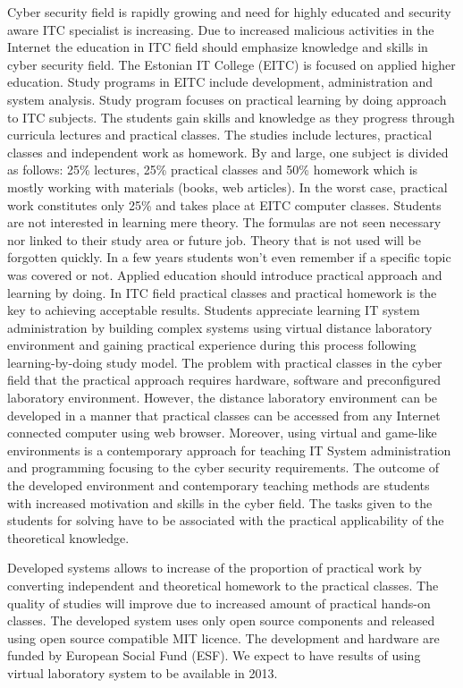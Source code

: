 
Cyber security field is rapidly growing and need for highly educated and security aware ITC specialist is increasing. Due to increased malicious activities in the Internet the education in ITC field should emphasize knowledge and skills in cyber security field.
The Estonian IT College (EITC) is focused on applied higher education. Study programs in EITC include development, administration and system analysis. Study program focuses on practical learning by doing approach to ITC subjects. The students gain skills and knowledge as they progress through curricula lectures and practical classes. The studies include lectures, practical classes and independent work as homework. By and large, one subject is divided as follows: 25\% lectures, 25\% practical classes and 50\% homework which is mostly working with materials (books, web articles). In the worst case, practical work constitutes only 25\% and takes place at EITC computer classes. Students are not interested in learning mere theory. The formulas are not seen necessary nor linked to their study area or future job. Theory that is not used will be forgotten quickly. In a few years students won't even remember if a specific topic was covered or not. Applied education should introduce practical approach and learning by doing. In ITC field practical classes and practical homework is the key to achieving acceptable results. Students appreciate learning IT system administration by building complex systems using virtual distance laboratory environment and gaining practical experience during this process following learning-by-doing study model.
The problem with practical classes in the cyber field that the practical approach requires hardware, software and preconfigured laboratory environment. However, the  distance laboratory environment can be developed in a manner  that practical classes can be accessed from any Internet connected computer using web browser. Moreover, using virtual and game-like environments is a contemporary approach for teaching IT System administration and programming focusing to the cyber security requirements. The outcome of the developed environment and contemporary teaching methods are students with increased motivation and skills in the cyber field. The tasks given to the students for solving have to be associated with the practical applicability of the theoretical knowledge.

Developed systems allows to  increase of the proportion of practical work by converting independent and theoretical homework to  the practical classes. The quality of studies will improve due to increased amount of practical hands-on classes. The developed system uses only open source components and released using open source compatible MIT licence. The development and hardware are funded by European Social Fund (ESF). We expect to have results of using virtual laboratory system to be available in 2013.



\cite{van1999cluster}
\cite{yoga}
\cite{OppeArenduskeskus2010}


